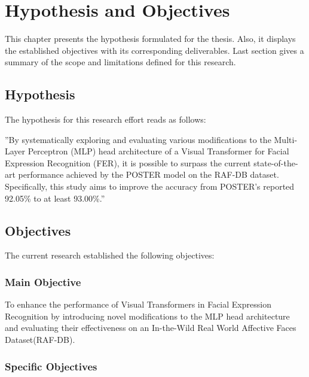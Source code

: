 \chapter{Hypothesis and Objectives}
\label{chapter:hypothesis-objectives}

This chapter presents the hypothesis formulated for the thesis. Also, it displays the established objectives with its corresponding deliverables. Last section gives a summary of the scope and limitations defined for this research.

\section{Hypothesis}
\label{section:hypothesis}

The hypothesis for this research effort reads as follows:



''By systematically exploring and evaluating various modifications to the Multi-Layer Perceptron (MLP) head architecture of a Visual Transformer for Facial Expression Recognition (FER), it is possible to surpass the current state-of-the-art performance achieved by the POSTER model on the RAF-DB dataset. Specifically, this study aims to improve the accuracy from POSTER's reported 92.05\% to at least 93.00\%.''


\section{Objectives}
\label{section:objectives}
The current research established the following objectives:

\subsection{Main Objective}
\label{section:main-objective}
\label{objective:main}

To enhance the performance of Visual Transformers in Facial Expression Recognition by introducing novel modifications to the MLP head architecture and evaluating their effectiveness on an In-the-Wild Real World Affective Faces Dataset(RAF-DB).

\subsection{Specific Objectives}
\label{section:specific-objectives}

